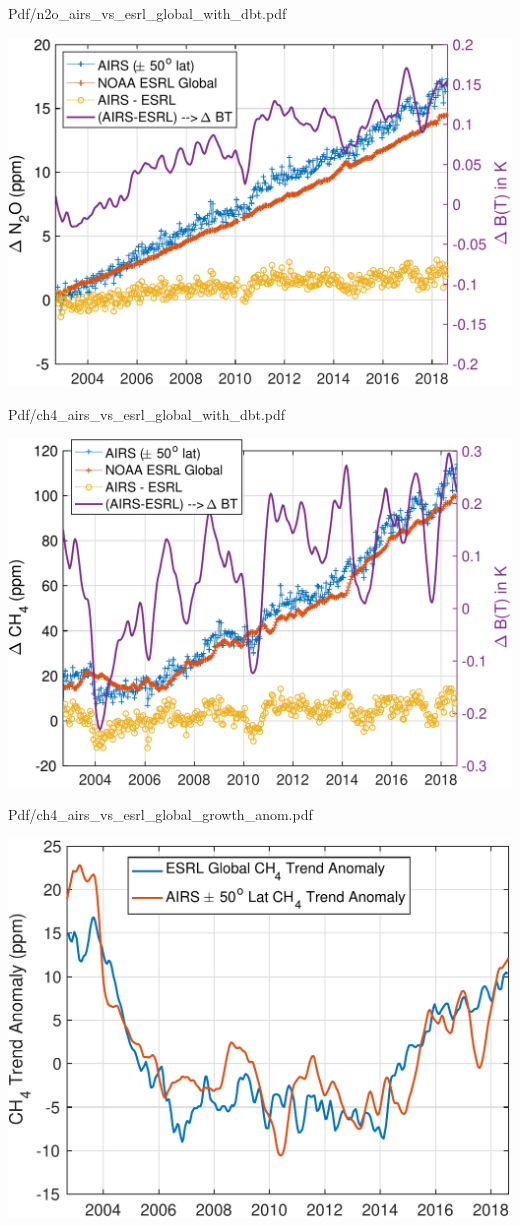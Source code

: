 \documentclass[10pt,t]{beamer}
\begin{document}
\begin{frame}[label={sec:org41451de}]{Pdf/n2o\_airs\_vs\_esrl\_global\_with\_dbt.pdf}
\begin{center}
\includegraphics[width=0.7\linewidth]{./Figs/Pdf/n2o_airs_vs_esrl_global_with_dbt.pdf}
\end{center}
\end{frame}

\begin{frame}[label={sec:org95b2593}]{Pdf/ch4\_airs\_vs\_esrl\_global\_with\_dbt.pdf}
\begin{center}
\includegraphics[width=0.7\linewidth]{./Figs/Pdf/ch4_airs_vs_esrl_global_with_dbt.pdf}
\end{center}
\end{frame}

\begin{frame}[label={sec:orgd14d823}]{Pdf/ch4\_airs\_vs\_esrl\_global\_growth\_anom.pdf}
\begin{center}
\includegraphics[width=0.7\linewidth]{./Figs/Pdf/ch4_airs_vs_esrl_global_growth_anom.pdf}
\end{center}
\end{frame}
\end{document}
